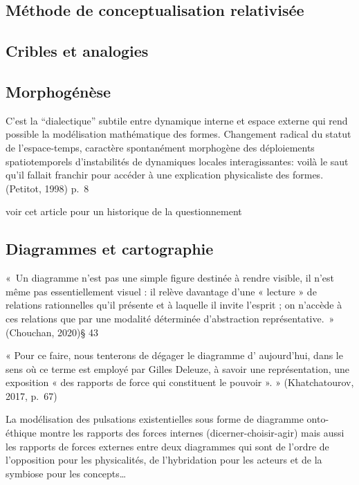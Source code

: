 \documentclass[
  a4paper,
  DIV=11,
  numbers=noendperiod]{scrreprt}
\begin{document}
\subsection{Méthode de conceptualisation
relativisée}\label{muxe9thode-de-conceptualisation-relativisuxe9e}

\subsection{Cribles et analogies}\label{cribles-et-analogies}

\subsection{Morphogénèse}\label{morphoguxe9nuxe8se}

C'est la ``dialectique'' subtile entre dynamique interne et espace
externe qui rend possible la modélisation mathématique des formes.
Changement radical du statut de l'espace-temps, caractère spontanément
morphogène des déploiements spatiotemporels d'instabilités de dynamiques
locales interagissantes: voilà le saut qu'il fallait franchir pour
accéder à une explication physicaliste des formes. (Petitot, 1998) p.~8

voir cet article pour un historique de la questionnement

\subsection{Diagrammes et
cartographie}\label{diagrammes-et-cartographie}

«~Un diagramme n'est pas une simple figure destinée à rendre visible, il
n'est même pas essentiellement visuel : il relève davantage d'une «
lecture » de relations rationnelles qu'il présente et à laquelle il
invite l'esprit ; on n'accède à ces relations que par une modalité
déterminée d'abstraction représentative.~» (Chouchan, 2020)§ 43

« Pour ce faire, nous tenterons de dégager le diagramme d' aujourd'hui,
dans le sens où ce terme est employé par Gilles Deleuze, à savoir une
représentation, une exposition « des rapports de force qui constituent
le pouvoir ». » (Khatchatourov, 2017, p.~67)

La modélisation des pulsations existentielles sous forme de diagramme
onto-éthique montre les rapports des forces internes
(dicerner-choisir-agir) mais aussi les rapports de forces externes entre
deux diagrammes qui sont de l'ordre de l'opposition pour les
physicalités, de l'hybridation pour les acteurs et de la symbiose pour
les concepts\ldots{}
\end{document}

